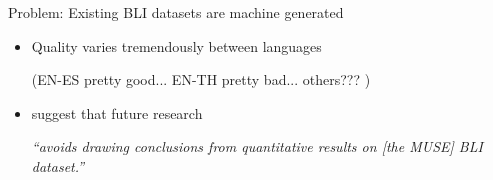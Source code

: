 \documentclass{beamer}
\begin{document}
\begin{frame}{Problem: Existing BLI datasets are machine generated}
\begin{itemize}
            \vspace{0.2in}
        \item
            Quality varies tremendously between languages
            
            (EN-ES pretty good... EN-TH pretty bad... others??? )

            \vspace{0.1in}
        \item \citet{kementchedjhieva2019lost} suggest that future research 
            
            \emph{
                ``avoids drawing conclusions from quantitative results on [the MUSE] BLI dataset.''
            }
    \end{itemize}
\end{frame}
\end{document}

